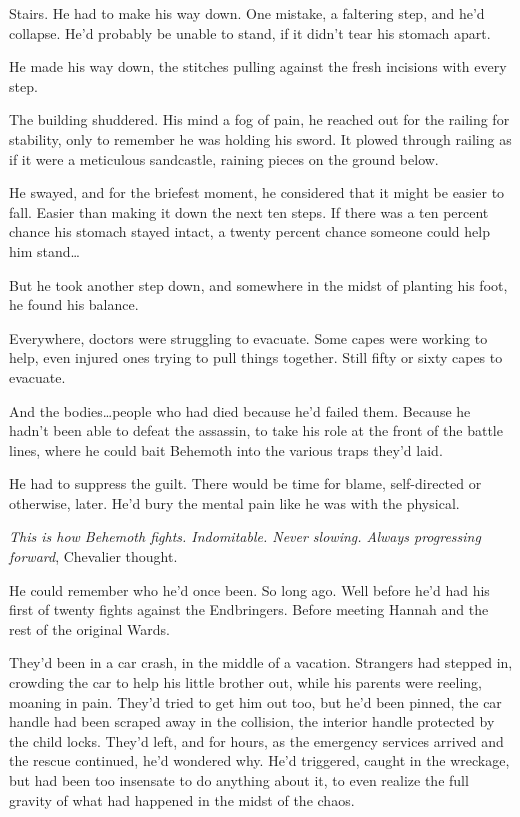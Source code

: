 Stairs.  He had to make his way down.  One mistake, a faltering step, and he'd collapse.  He'd probably be unable to stand, if it didn't tear his stomach apart.



He made his way down, the stitches pulling against the fresh incisions with every step.



The building shuddered.  His mind a fog of pain, he reached out for the railing for stability, only to remember he was holding his sword.  It plowed through railing as if it were a meticulous sandcastle, raining pieces on the ground below.



He swayed, and for the briefest moment, he considered that it might be easier to fall.  Easier than making it down the next ten steps.  If there was a ten percent chance his stomach stayed intact, a twenty percent chance someone could help him stand\ldots



But he took another step down, and somewhere in the midst of planting his foot, he found his balance.



Everywhere, doctors were struggling to evacuate.  Some capes were working to help, even injured ones trying to pull things together.  Still fifty or sixty capes to evacuate.



And the bodies\ldots people who had died because he'd failed them.  Because he hadn't been able to defeat the assassin, to take his role at the front of the battle lines, where he could bait Behemoth into the various traps they'd laid.



He had to suppress the guilt.  There would be time for blame, self-directed or otherwise, later.  He'd bury the mental pain like he was with the physical.



\emph{This is how Behemoth fights.  Indomitable.  Never slowing.  Always progressing forward}, Chevalier thought.



He could remember who he'd once been.  So long ago.  Well before he'd had his first of twenty fights against the Endbringers.  Before meeting Hannah and the rest of the original Wards.



They'd been in a car crash, in the middle of a vacation.  Strangers had stepped in, crowding the car to help his little brother out, while his parents were reeling, moaning in pain.  They'd tried to get him out too, but he'd been pinned, the car handle had been scraped away in the collision, the interior handle protected by the child locks.  They'd left, and for hours, as the emergency services arrived and the rescue continued, he'd wondered why.  He'd triggered, caught in the wreckage, but had been too insensate to do anything about it, to even realize the full gravity of what had happened in the midst of the chaos.




